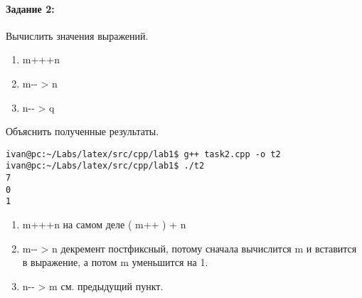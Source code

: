 \paragraph{Задание 2:}
Вычислить значения выражений.
\begin{enumerate}
    \item {\ttfamily m+++n}
    \item {\ttfamily m-{}- > n}
    \item {\ttfamily n-{}- > q}
\end{enumerate}
Объяснить полученные результаты.


\begin{lstlisting}[label={lst:bash}]
ivan@pc:~/Labs/latex/src/cpp/lab1$ g++ task2.cpp -o t2
ivan@pc:~/Labs/latex/src/cpp/lab1$ ./t2
7
0
1
\end{lstlisting}

\begin{enumerate}
    \item {\ttfamily m+++n} на самом деле {\ttfamily ( m++ ) + n}
    \item {\ttfamily m-{}- > n} декремент постфиксный, потому сначала вычислится
          {\ttfamily m} и вставится в выражение, а потом {\ttfamily m} уменьшится на 1.
    \item {\ttfamily n-{}- > m} см.{} предыдущий пункт.
\end{enumerate}

